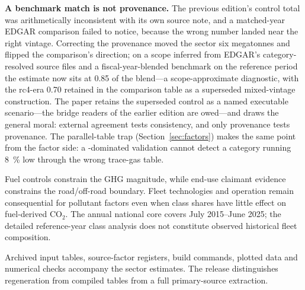 \textbf{A benchmark match is not provenance.} The previous edition's control total was
arithmetically inconsistent with its own source note, and a matched-year EDGAR comparison
failed to notice, because the wrong number landed near the right vintage. Correcting the
provenance moved the sector six megatonnes and flipped the comparison's direction; on a
scope inferred from EDGAR's category-resolved source files and a fiscal-year-blended
benchmark on the reference period the estimate now sits at \num{0.85} of the blend---a
scope-approximate diagnostic, with the rc4-era \num{0.70} retained in the comparison
table as a superseded mixed-vintage construction. The
paper retains the superseded control as a named executable scenario---the bridge readers
of the earlier edition are owed---and draws the general moral: external agreement tests
consistency, and only provenance tests provenance. The parallel-table \NtwoO{} trap
(Section~\ref{sec:factors}) makes the same point from the factor side: a
\COtwo{}-dominated validation cannot detect a category running \SI{8}{\percent} low
through the wrong trace-gas table.

Fuel controls constrain the GHG magnitude, while end-use claimant evidence constrains the road/off-road boundary. Fleet technologies and operation remain consequential for pollutant factors even when class shares have little effect on fuel-derived CO$_2$. The annual national core covers July 2015--June 2025; the detailed reference-year class analysis does not constitute observed historical fleet composition.

Archived input tables, source-factor registers, build commands, plotted data and numerical checks accompany the sector estimates. The release distinguishes regeneration from compiled tables from a full primary-source extraction.
